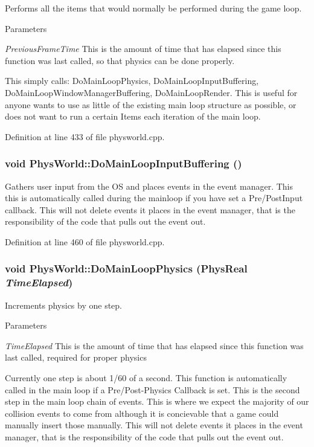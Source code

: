 Performs all the items that would normally be performed during the game loop. 
\begin{DoxyParams}{Parameters}
\item[{\em PreviousFrameTime}]This is the amount of time that has elapsed since this function was last called, so that physics can be done properly.\end{DoxyParams}
This simply calls: DoMainLoopPhysics, DoMainLoopInputBuffering, DoMainLoopWindowManagerBuffering, DoMainLoopRender. This is useful for anyone wants to use as little of the existing main loop structure as possible, or does not want to run a certain Items each iteration of the main loop. 

Definition at line 433 of file physworld.cpp.\hypertarget{classPhysWorld_a81b3f0dcc0a90d039623f696343e6e9c}{
\subsubsection[{DoMainLoopInputBuffering}]{\setlength{\rightskip}{0pt plus 5cm}void PhysWorld::DoMainLoopInputBuffering ()}}
\label{db/df5/classPhysWorld_a81b3f0dcc0a90d039623f696343e6e9c}


Gathers user input from the OS and places events in the event manager. This this is automatically called during the mainloop if you have set a Pre/PostInput callback. This will not delete events it places in the event manager, that is the responsibility of the code that pulls out the event out. 

Definition at line 460 of file physworld.cpp.\hypertarget{classPhysWorld_ad7455b4f54e8bac0aab090033cff59d4}{
\subsubsection[{DoMainLoopPhysics}]{\setlength{\rightskip}{0pt plus 5cm}void PhysWorld::DoMainLoopPhysics (PhysReal {\em TimeElapsed})}}
\label{db/df5/classPhysWorld_ad7455b4f54e8bac0aab090033cff59d4}


Increments physics by one step. 
\begin{DoxyParams}{Parameters}
\item[{\em TimeElapsed}]This is the amount of time that has elapsed since this function was last called, required for proper physics\end{DoxyParams}
Currently one step is about 1/60 of a second. This function is automatically called in the main loop if a Pre/Post-\/Physics Callback is set. This is the second step in the main loop chain of events. This is where we expect the majority of our collision events to come from although it is concievable that a game could manually insert those manually. This will not delete events it places in the event manager, that is the responsibility of the code that pulls out the event out. 

